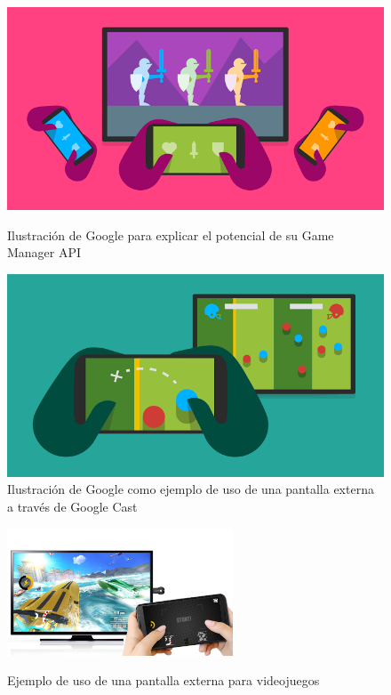 \begin{figure}[h]
	\centering
	\begin{minipage}[b]{.35\textwidth}
		\includegraphics[scale=0.3]{./Imagenes/games.png}
		\caption{Ilustración de Google para explicar el potencial de su Game Manager API}\label{fig:games}
	\end{minipage}\qquad
	\hspace{1cm}
	\begin{minipage}[b]{.35\textwidth}
		\includegraphics[scale=0.3]{./Imagenes/seconddisplay.png}
		\caption{Ilustración de Google como ejemplo de uso de una pantalla externa a través de Google Cast}\label{fig:seconddisplay}
	\end{minipage}
\end{figure}

\begin{figure}[h]
	\centering
	\includegraphics[width=0.6\textwidth]{./Imagenes/gameexample.jpg}
	\label{fig:fondo}
	\caption{Ejemplo de uso de una pantalla externa para videojuegos}
\end{figure}


